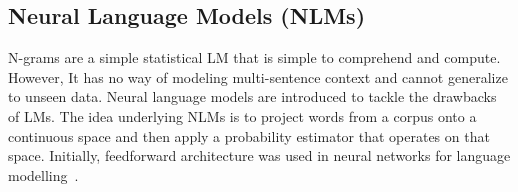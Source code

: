 \subsection{Neural Language Models (NLMs)}
N-grams are a simple statistical LM that is simple to comprehend and compute. However, It has no way of modeling multi-sentence context and cannot generalize to unseen data. 
Neural language models are introduced to tackle the drawbacks of LMs.
The idea underlying NLMs is to project words from a corpus onto a continuous space and then apply a probability estimator that operates on that space. Initially, feedforward architecture was used in neural networks for language modelling~\cite{advancesnlm}.




